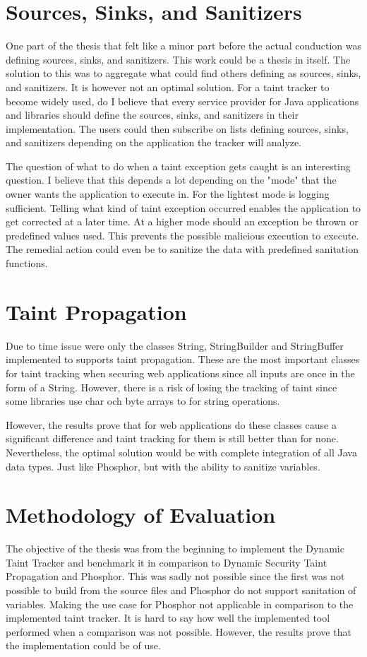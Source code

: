 \section{Sources, Sinks, and Sanitizers}
\label{sss}
One part of the thesis that felt like a minor part before the actual conduction was defining sources, sinks, and sanitizers. This work could be a thesis in itself. The solution to this was to aggregate what could find others defining as sources, sinks, and sanitizers. It is however not an optimal solution. For a taint tracker to become widely used, do I believe that every service provider for Java applications and libraries should define the sources, sinks, and sanitizers in their implementation. The users could then subscribe on lists defining sources, sinks, and sanitizers depending on the application the tracker will analyze.

The question of what to do when a taint exception gets caught is an interesting question. I believe that this depends a lot depending on the "mode" that the owner wants the application to execute in. For the lightest mode is logging sufficient. Telling what kind of taint exception occurred enables the application to get corrected at a later time. At a higher mode should an exception be thrown or predefined values used. This prevents the possible malicious execution to execute. The remedial action could even be to sanitize the data with predefined sanitation functions. 



\section{Taint Propagation}
\label{propagation}
Due to time issue were only the classes String, StringBuilder and StringBuffer implemented to supports taint propagation. These are the most important classes for taint tracking when securing web applications since all inputs are once in the form of a String. However, there is a risk of losing the tracking of taint since some libraries use char och byte arrays to for string operations.

However, the results prove that for web applications do these classes cause a significant difference and taint tracking for them is still better than for none. Nevertheless, the optimal solution would be with complete integration of all Java data types. Just like Phosphor, but with the ability to sanitize variables.



\section{Methodology of Evaluation}
\label{methev}
The objective of the thesis was from the beginning to implement the Dynamic Taint Tracker and benchmark it in comparison to Dynamic Security Taint Propagation and Phosphor. This was sadly not possible since the first was not possible to build from the source files and Phosphor do not support sanitation of variables. Making the use case for Phosphor not applicable in comparison to the implemented taint tracker. It is hard to say how well the implemented tool performed when a comparison was not possible. However, the results prove that the implementation could be of use.